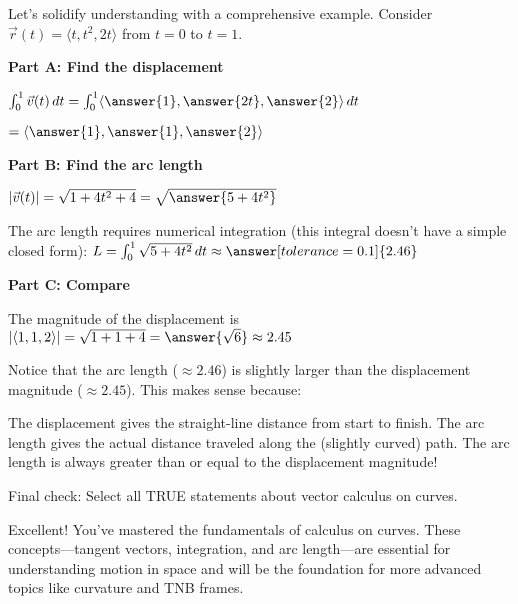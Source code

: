 \documentclass{ximera}
\begin{document}
\begin{problem}
Let's solidify understanding with a comprehensive example. Consider $\vec{r}(t) = \langle t, t^2, 2t \rangle$ from $t=0$ to $t=1$.

\textbf{Part A: Find the displacement}

$\int_0^1 \vec{v}(t) \, dt = \int_0^1 \langle \answer{1}, \answer{2t}, \answer{2} \rangle \, dt$

$= \langle \answer{1}, \answer{1}, \answer{2} \rangle$

\textbf{Part B: Find the arc length}

$|\vec{v}(t)| = \sqrt{1 + 4t^2 + 4} = \sqrt{\answer{5 + 4t^2}}$

The arc length requires numerical integration (this integral doesn't have a simple closed form):
$L = \int_0^1 \sqrt{5 + 4t^2} \, dt \approx \answer[tolerance=0.1]{2.46}$

\textbf{Part C: Compare}

The magnitude of the displacement is $|\langle 1, 1, 2 \rangle| = \sqrt{1+1+4} = \answer{\sqrt{6}} \approx 2.45$

Notice that the arc length ($\approx 2.46$) is slightly larger than the displacement magnitude ($\approx 2.45$). This makes sense because:
\begin{multipleChoice}
\end{multipleChoice}

\begin{feedback}
The displacement gives the straight-line distance from start to finish. The arc length gives the actual distance traveled along the (slightly curved) path. The arc length is always greater than or equal to the displacement magnitude!
\end{feedback}
\end{problem}

\begin{problem}
Final check: Select all TRUE statements about vector calculus on curves.

\begin{selectAll}
\end{selectAll}

\begin{feedback}
Excellent! You've mastered the fundamentals of calculus on curves. These concepts—tangent vectors, integration, and arc length—are essential for understanding motion in space and will be the foundation for more advanced topics like curvature and TNB frames.
\end{feedback}
\end{problem}
\end{document}
